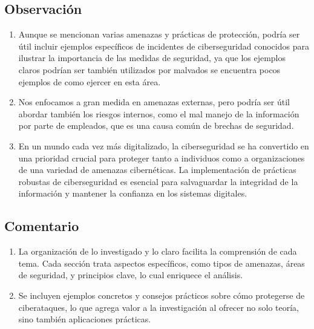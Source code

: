 \documentclass[12pt]{article}
\begin{document}
\subsection*{Observación}
\begin{enumerate}
    \item Aunque se mencionan varias amenazas y prácticas de protección, podría ser útil incluir ejemplos específicos de incidentes de ciberseguridad conocidos para ilustrar la importancia de las medidas de seguridad, ya que los ejemplos claros podrían ser también utilizados por malvados se encuentra pocos ejemplos de como ejercer en esta área.
    \item Nos enfocamos a gran medida en amenazas externas, pero podría ser útil abordar también los riesgos internos, como el mal manejo de la información por parte de empleados, que es una causa común de brechas de seguridad.
    \item En un mundo cada vez más digitalizado, la ciberseguridad se ha convertido en una prioridad crucial para proteger tanto a individuos como a organizaciones de una variedad de amenazas cibernéticas. La implementación de prácticas robustas de ciberseguridad es esencial para salvaguardar la integridad de la información y mantener la confianza en los sistemas digitales.
\end{enumerate}

\subsection*{Comentario}
\begin{enumerate}
    \item La organización de lo investigado y lo claro facilita la comprensión de cada tema. Cada sección trata aspectos específicos, como tipos de amenazas, áreas de seguridad, y principios clave, lo cual enriquece el análisis.
    \item Se incluyen ejemplos concretos y consejos prácticos sobre cómo protegerse de ciberataques, lo que agrega valor a la investigación al ofrecer no solo teoría, sino también aplicaciones prácticas.
\end{enumerate}
\end{document}
